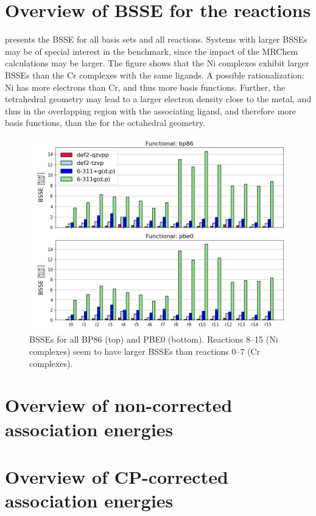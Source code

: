\documentclass[11pt,a4paper]{article}
\begin{document}
\section{Overview of BSSE for the reactions}
 presents the BSSE for all basis sets and all reactions. 
Systems with larger BSSEs may be of special interest in the benchmark, since the impact of
the MRChem calculations may be larger.
The figure shows that the Ni complexes exhibit larger BSSEs than the Cr complexes with the same ligands.
A possible rationalization: Ni has more electrons than Cr, and thus more basis functions.
Further, the tetrahedral geometry may lead to a larger electron density close to the metal, and thus in the overlapping region with the associating ligand, and therefore more basis functions, than the for the octahedral geometry.

\begin{figure}[H]
	\centering
	\includegraphics[width = \textwidth]{../figs/bsse.png}
	\caption{BSSEs for all BP86 (top) and PBE0 (bottom). Reactions 8--15 (Ni complexes) seem to have larger BSSEs than reactions 0--7 (Cr complexes).}
	\label{fig: bsse overview}
\end{figure}

\section{Overview of non-corrected association energies}

\section{Overview of CP-corrected association energies}
\end{document}
